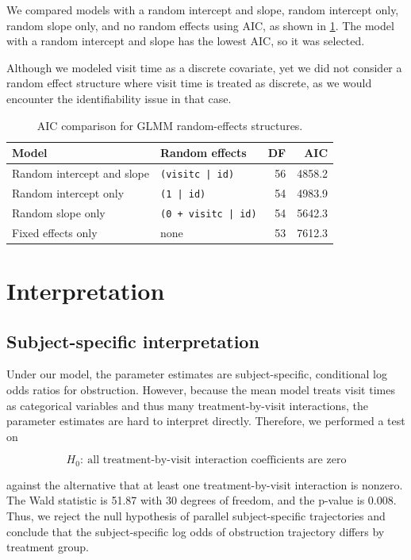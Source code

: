 \documentclass[12pt]{article}
\begin{document}
We compared models with a random intercept and slope, random intercept only,
random slope only, and no random effects using AIC, as shown in
\cref{tab:glmm-aic-comparison}. The model with a random intercept and slope
has the lowest AIC, so it was selected.

Although we modeled visit time as a discrete covariate,
yet we did not consider a random effect structure where
visit time is treated as discrete, as we would encounter
the identifiability issue in that case.

\begin{table}[htbp]
\caption{AIC comparison for GLMM random-effects structures.}
\centering
\begin{tabular}{llrr}
\hline
Model & Random effects & DF & AIC\\
\hline
Random intercept and slope & \texttt{(visitc | id)} & 56 & 4858.2\\
Random intercept only & \texttt{(1 | id)} & 54 & 4983.9\\
Random slope only & \texttt{(0 + visitc | id)} & 54 & 5642.3\\
Fixed effects only & none & 53 & 7612.3\\
\hline
\end{tabular}
\label{tab:glmm-aic-comparison}
\end{table}

\section{Interpretation}

\subsection{Subject-specific interpretation}

Under our model, the parameter estimates
are subject-specific, conditional log odds ratios for obstruction.
However, because the mean model treats visit times as categorical variables and 
thus many treatment-by-visit interactions, the parameter estimates are
hard to interpret directly. Therefore, we performed a test on

\[
H_0:\ \text{all treatment-by-visit interaction coefficients are zero}
\]

against the alternative that at least one treatment-by-visit interaction is
nonzero. 
The Wald statistic is 51.87 with
30 degrees of freedom, and the p-value is 0.008. Thus, we reject the null
hypothesis of parallel subject-specific trajectories and conclude that the
subject-specific log odds of obstruction trajectory differs by treatment group.
\end{document}

